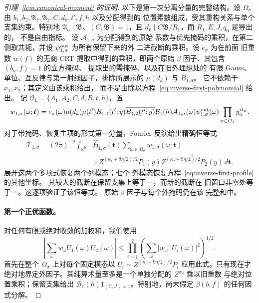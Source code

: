 \documentclass[11pt,a4paper]{article}
\numberwithin{equation}{section}
\numberwithin{figure}{section}
\theoremstyle{definition}
\theoremstyle{remark}
\begin{document}
\begin{proof}[引理~\ref{lem:canonical-moment} 的证明]
以下是第一次分离分量的完整结构。设
\(\Omega_\sigma\) 由
\(b_1,b_2,\mathfrak A_1,\mathfrak A_2,C,d_k,t',f,h\) 以及分配得到的
位置素数组成，受其重构关系与单个
支集约束。特别地
\(\mathfrak A_a\mid\mathfrak B\)、\((C,\mathfrak B)=1\)，且
\(d_k\mid C\mathfrak B/R_1\)，而 \(R_1,E,J,q_0\) 是导出的，
不是自由指标。
设 \(\mathcal A_{1,\sigma}\) 为分配得到的原始
系数与优先掩码的乘积，在第二侧取共轭，并设
\(\psi_{1,\sigma}^{\rm out}\) 为所有保留下来的外
二进截断的乘积。设 \(e_\sigma\) 为在前面
旧重数 \(w(f)\) 的无商 CRT 提取中得到的乘积，即两个原始
\(\beta\) 因子、其包含 \((b_a,f)=1\) 的立方掩码、
提取出的零掩码、以及在旧外理想处的
有限 Gauss、单位、互反律与第一射线因子，排除所展示的 \(\mu(d_k)\) 与 \(B_{1,a}\)。
它不依赖于 \(x_1,x_2\)；其定义由该乘积给出，
而不是由除以方程~\eqref{eq:inverse-first-polynomial} 给出。
记 \(\mathcal O_1=\{A_1,A_2,C,d,R,t,h\}\)，置
\[
 w_{1,\sigma}(\omega;\boldsymbol t)
 =e_\sigma(\omega)\mu(d_k)\mu(t')B_{1,1}(t';y)
       \overline{B_{1,2}(t';y)}\mathcal B_1(h)
       \mathcal A_{1,\sigma}(\omega)\psi_{1,\sigma}^{\rm out}(\omega)
       \prod_{\alpha\in\mathcal O_1}y_\alpha^{it_\alpha}.
\]
对于带掩码、恢复主项的形式第一分量，Fourier
反演给出精确恒等式
\begin{equation}\label{eq:inverse-first-separated}
 \begin{split}
 \mathcal T_{1,\sigma}=(2\pi)^{-9}\int_{\mathbb R^9}
 &\widehat{\mathfrak H}_{1,\sigma}(\boldsymbol t)
 \sum_{\omega\in\Omega_\sigma}w_{1,\sigma}(\omega;\boldsymbol t)\\
 &\times Z^{(\kappa_1+9\eta/2)/2}P_1(y)
       \overline{Z^{(\kappa_2+9\eta/2)/2}P_2(y)}\,d\boldsymbol t.
 \end{split}
\end{equation}
展开这两个多项式恢复两个列模态；七个
外模态恢复方程~\eqref{eq:inverse-first-profile} 的其他坐标。
其较大的截断在保留支集上等于一，而新的截断在
旧窗口非零处等于一。这逐项验证了该恒等式。
原始 \(\beta\) 因子与每个外掩码仍在该
完整和中。

\paragraph{第一个正优函数。}
对任何有限或绝对收敛的加权和，我们使用
\begin{equation}\tag{D}\label{eq:weighted-cauchy}
 \left|\sum_\omega w_\omega U_1(\omega)\overline{U_2(\omega)}\right|
 \le\prod_{i=1}^2
       \left(\sum_\omega|w_\omega||U_i(\omega)|^2\right)^{1/2}.
\end{equation}
首先在整个
\(\Omega_\sigma\) 上对每个固定模态以 \(U_i=Z^{(\kappa_i+9\eta/2)/2}P_i\)
应用此式。只有现在才绝对地界定外因子。其纯算术量至多是一个单独分配的 \(Z^{\pi_\beta}\) 乘以旧重数
与绝对位置乘积；保留支集给出
\(\mathcal B_1(h)1_{(C,J)=1}\)。特别地，尚未假定
\(\beta(b,f)\) 的任何因式分解。


\end{proof}
\end{document}

